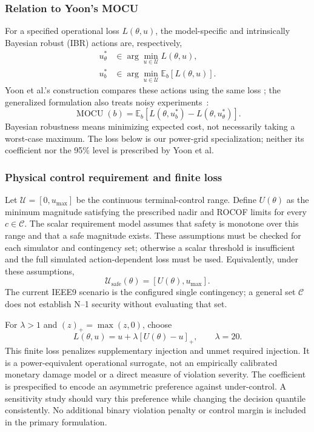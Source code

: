 \subsubsection{Relation to Yoon's MOCU}
For a specified operational loss $L(\theta,u)$, the model-specific and
intrinsically Bayesian robust (IBR) actions are, respectively,
\begin{align}
u_\theta^*&\in\arg\min_{u\in\mathcal U}L(\theta,u),\\
u_b^*&\in\arg\min_{u\in\mathcal U}\mathbb E_b[L(\theta,u)].
\label{eq:bayesian-control}
\end{align}
Yoon et al.'s construction compares these actions using the same loss
\cite{yoon2013mocu}; the generalized formulation also treats noisy
experiments~\cite{boluki2018generalized}:
\begin{equation}
\operatorname{MOCU}(b)=\mathbb E_b[L(\theta,u_b^*)-L(\theta,u_\theta^*)].
\label{eq:general_mocu}
\end{equation}
Bayesian robustness means minimizing expected cost, not necessarily taking a
worst-case maximum. The loss below is our power-grid specialization; neither
its coefficient nor the 95\% level is prescribed by Yoon et al.

\subsubsection{Physical control requirement and finite loss}
Let $\mathcal U=[0,u_{\max}]$ be the continuous terminal-control range. Define
$U(\theta)$ as the minimum magnitude satisfying the prescribed nadir and
ROCOF limits for every $c\in\mathcal C$. The scalar requirement model assumes
that safety is monotone over this range and that a safe magnitude exists.
These assumptions must be checked for each simulator and contingency set;
otherwise a scalar threshold is insufficient and the full simulated
action-dependent loss must be used. Equivalently, under these assumptions,
\begin{equation}
\mathcal U_{\mathrm{safe}}(\theta)=[U(\theta),u_{\max}].
\label{eq:safe_control_set}
\end{equation}
The current IEEE9 scenario is the configured single contingency; a general
set $\mathcal C$ does not establish N--1 security without evaluating that set.

For $\lambda>1$ and $(z)_+=\max(z,0)$, choose
\begin{equation}
L(\theta,u)=u+\lambda[U(\theta)-u]_+,
\qquad \lambda=20.
\label{eq:operational_cost}
\end{equation}
This finite loss penalizes supplementary injection and unmet required
injection. It is a power-equivalent operational surrogate, not an empirically
calibrated monetary damage model or a direct measure of violation severity.
The coefficient is prespecified to encode an asymmetric preference against
under-control. A sensitivity study should vary this preference while changing
the decision quantile consistently. No additional binary violation penalty
or control margin is included in the primary formulation.

